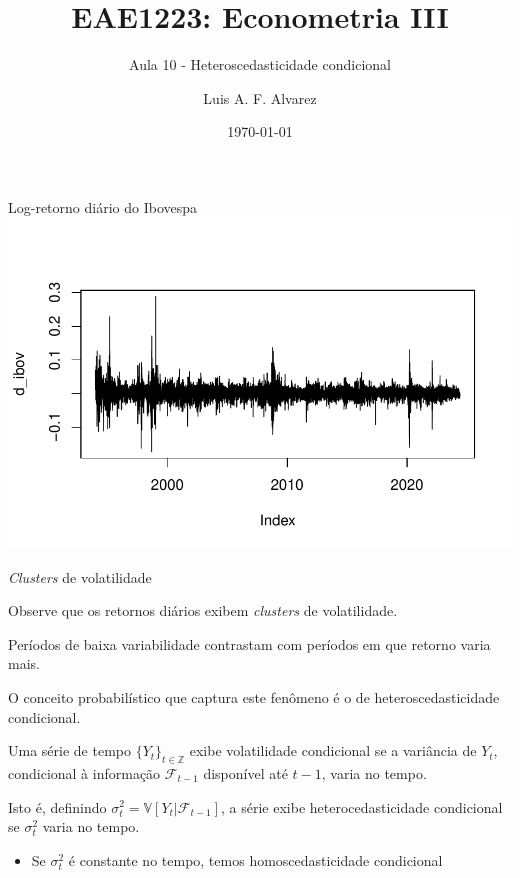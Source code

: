 \documentclass[11pt]{beamer}
\author{Luis A. F. Alvarez}
\title{EAE1223: Econometria III}
\subtitle{Aula 10 - Heteroscedasticidade condicional}
\date{\today}
\newenvironment{halfwideitemize}{\itemize\addtolength{\itemsep}{0.5em}}{\enditemize}
\begin{document}
\begin{frame}[plain]
	\maketitle
\end{frame}

\begin{frame}{Log-retorno diário do Ibovespa}
\centering
\includegraphics[scale=0.8]{plots/dibov.pdf}
\end{frame}

\begin{frame}{\textit{Clusters} de volatilidade}
\begin{halfwideitemize}
	\item Observe que os retornos diários exibem \textit{clusters} de volatilidade.
	\begin{halfwideitemize}
		\item Períodos de baixa variabilidade contrastam com períodos em que retorno varia mais.
	\end{halfwideitemize}
	\item O conceito probabilístico que captura este fenômeno é o de {\color{blue}heteroscedasticidade condicional}.
	\item Uma série de tempo $\{Y_t\}_{t \in \mathbb{Z}}$ exibe volatilidade condicional se a variância de $Y_t$, {\color{blue} condicional à informação $\mathcal{F}_{t-1}$ disponível até $t-1$}, varia no tempo.
	\item Isto é, definindo $\sigma_t^2 = \mathbb{V}[Y_t|\mathcal{F}_{t-1}]$, a série exibe heterocedasticidade condicional se  $\sigma^2_t$ varia no tempo.
	\begin{itemize}
		\item Se $\sigma^2_t$ é constante no tempo, temos homoscedasticidade condicional
	\end{itemize}
\end{halfwideitemize}
\end{frame}
\end{document}
